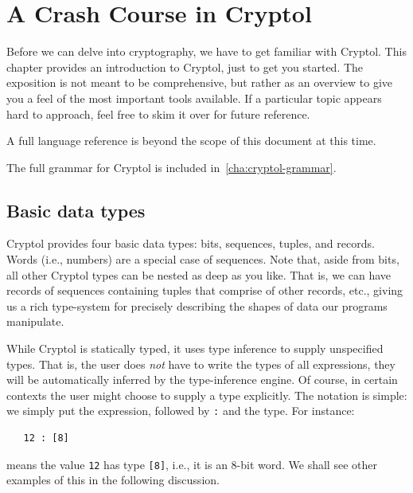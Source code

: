 
\chapter{A Crash Course in Cryptol}
\label{cha:crash-course-cryptol}

Before we can delve into cryptography, we have to get familiar with
Cryptol.  This chapter provides an introduction to Cryptol, just to
get you started. The exposition is not meant to be comprehensive, but
rather as an overview to give you a feel of the most important tools
available.  If a particular topic appears hard to approach, feel free
to skim it over for future reference.  

A full language reference is beyond the scope of this document at this
time.

The full grammar for Cryptol is included
in~\autoref{cha:cryptol-grammar}.

\section{Basic data types}
\label{sec:basic-data-types}

Cryptol provides four basic data types: bits, sequences, tuples, and
records.  Words (i.e., numbers) are a special case of sequences.  Note
that, aside from bits, all other Cryptol types can be nested as deep
as you like. That is, we can have records of sequences containing
tuples that comprise of other records, etc., giving us a rich
type-system for precisely describing the shapes of data our programs
manipulate.

While Cryptol is statically typed, it uses type inference to supply
unspecified types.  That is, the user does {\em not} have to write the
types of all expressions, they will be automatically inferred by the
type-inference engine.  Of course, in certain contexts the user might
choose to supply a type explicitly.  The notation is simple: we simply
put the expression, followed by {\tt :} and the type. For instance:
\begin{Verbatim}
   12 : [8]
\end{Verbatim}
means the value {\tt 12} has type {\tt [8]}, i.e., it is an 8-bit
word. We shall see other examples of this in the following discussion.


